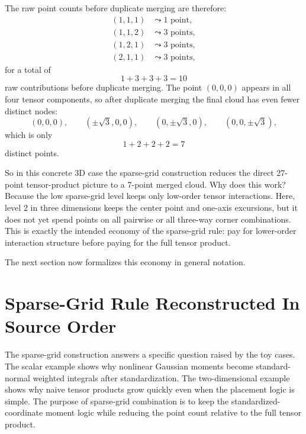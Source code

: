 \documentclass[11pt]{article}
\numberwithin{equation}{section}
\begin{document}
The raw point counts before duplicate merging are therefore:
\begin{align}
  (1,1,1) &\leadsto 1 \text{ point},
  \label{eq:p37-3d-count-111}\\
  (1,1,2) &\leadsto 3 \text{ points},
  \label{eq:p37-3d-count-112}\\
  (1,2,1) &\leadsto 3 \text{ points},
  \label{eq:p37-3d-count-121}\\
  (2,1,1) &\leadsto 3 \text{ points},
  \label{eq:p37-3d-count-211}
\end{align}
for a total of
\begin{equation}
  1+3+3+3=10
  \label{eq:p37-3d-raw-count}
\end{equation}
raw contributions before duplicate merging.  The point \((0,0,0)\) appears in
all four tensor components, so after duplicate merging the final cloud has even
fewer distinct nodes:
\begin{equation}
  (0,0,0),
  \qquad
  (\pm\sqrt3,0,0),
  \qquad
  (0,\pm\sqrt3,0),
  \qquad
  (0,0,\pm\sqrt3),
  \label{eq:p37-3d-final-nodes}
\end{equation}
which is only
\begin{equation}
  1+2+2+2 = 7
  \label{eq:p37-3d-final-count}
\end{equation}
distinct points.

So in this concrete 3D case the sparse-grid construction reduces the direct
27-point tensor-product picture to a 7-point merged cloud.  Why does this work?
Because the low sparse-grid level keeps only low-order tensor interactions.
Here, level 2 in three dimensions keeps the center point and one-axis excursions,
but it does not yet spend points on all pairwise or all three-way corner
combinations.  This is exactly the intended economy of the sparse-grid rule: pay
for lower-order interaction structure before paying for the full tensor product.

The next section now formalizes this economy in general notation.

\section{Sparse-Grid Rule Reconstructed In Source Order}
\label{sec:p31-sgq-reconstruction}

The sparse-grid construction answers a specific question raised by the toy cases.
The scalar example shows why nonlinear Gaussian moments become standard-normal
weighted integrals after standardization.  The two-dimensional example shows why
naive tensor products grow quickly even when the placement logic is simple.  The
purpose of sparse-grid combination is to keep the standardized-coordinate moment
logic while reducing the point count relative to the full tensor product.
\end{document}
